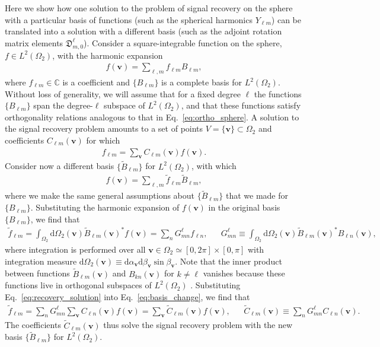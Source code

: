 \documentclass[notitlepage,twocolumn]{revtex4-2}
\newcommand{\p}[1]{\left(#1\right)} %
\renewcommand{\set}[1]{\{#1\}} %
\renewcommand{\v}{\bm} %
\newcommand{\1}{\mathds{1}}
\newcommand{\D}{\mathfrak{D}}
\renewcommand{\d}{\text{d}}
\newcommand{\CC}{\mathbb{C}}
\begin{document}
Here we show how one solution to the problem of signal recovery on the sphere with a particular basis of functions (such as the spherical harmonics $Y_{\ell m}$) can be translated into a solution with a different basis (such as the adjoint rotation matrix elements $\D^\ell_{m,0}$).
Consider a square-integrable function on the sphere, $f\in L^2\p{\Omega_2}$, with the harmonic expansion
\begin{align}
  f\p{\v v} = \sum_{\ell,m} f_{\ell m} B_{\ell m},
\end{align}
where $f_{\ell m}\in\CC$ is a coefficient and $\set{B_{\ell m}}$ is a complete basis for $L^2\p{\Omega_2}$.
Without loss of generality, we will assume that for a fixed degree $\ell$ the functions $\set{B_{\ell m}}$ span the degree-$\ell$ subspace of $L^2\p{\Omega_2}$, and that these functions satisfy orthogonality relations analogous to that in Eq.~\eqref{eq:ortho_sphere}.
A solution to the signal recovery problem amounts to a set of points $V=\set{\v v}\subset\Omega_2$ and coefficients $C_{\ell m}\p{\v v}$ for which
\begin{align}
  f_{\ell m} = \sum_{\v v} C_{\ell m}\p{\v v} f\p{\v v}.
  \label{eq:recovery_solution}
\end{align}
Consider now a different basis $\set{\tilde B_{\ell m}}$ for $L^2\p{\Omega_2}$, with which
\begin{align}
  f\p{\v v} = \sum_{\ell, m} \tilde f_{\ell m} \tilde B_{\ell m},
\end{align}
where we make the same general assumptions about $\set{\tilde B_{\ell m}}$ that we made for $\set{B_{\ell m}}$.
Substituting the harmonic expansion of $f\p{\v v}$ in the original basis $\set{B_{\ell m}}$, we find that
\begin{align}
  \tilde f_{\ell m} = \int_{\Omega_2} \d\Omega_2\p{\v v}
  \tilde B_{\ell m}\p{\v v}^* f\p{\v v}
  = \sum_n G^\ell_{mn} f_{\ell n},
  &&
  G^\ell_{mn} \equiv \int_{\Omega_2} \d\Omega_2\p{\v v}
  \tilde B_{\ell m}\p{\v v}^* B_{\ell n}\p{\v v},
  \label{eq:basis_change}
\end{align}
where integration is performed over all $\v v\in\Omega_2\simeq[0,2\pi]\times[0,\pi]$ with integration measure $\d\Omega_2\p{\v v} \equiv \d\alpha_{\v v} \d\beta_{\v v} \sin\beta_{\v v}$.
Note that the inner product between functions $\tilde B_{\ell m}\p{\v v}$ and $B_{kn}\p{\v v}$ for $k\ne\ell$ vanishes because these functions live in orthogonal subspaces of $L^2\p{\Omega_2}$ \cite{freeden2008spherical}.
Substituting Eq.~\eqref{eq:recovery_solution} into Eq.~\eqref{eq:basis_change}, we find that
\begin{align}
  \tilde f_{\ell m}
  = \sum_n G^\ell_{mn} \sum_{\v v} C_{\ell n}\p{\v v} f\p{\v v}
  = \sum_{\v v} \tilde C_{\ell m}\p{\v v} f\p{\v v},
  &&
  \tilde C_{\ell m}\p{\v v} \equiv \sum_n G^\ell_{mn} C_{\ell n}\p{\v v}.
\end{align}
The coefficients $\tilde C_{\ell m}\p{\v v}$ thus solve the signal recovery problem with the new basis $\set{\tilde B_{\ell m}}$ for $L^2\p{\Omega_2}$.
\end{document}
